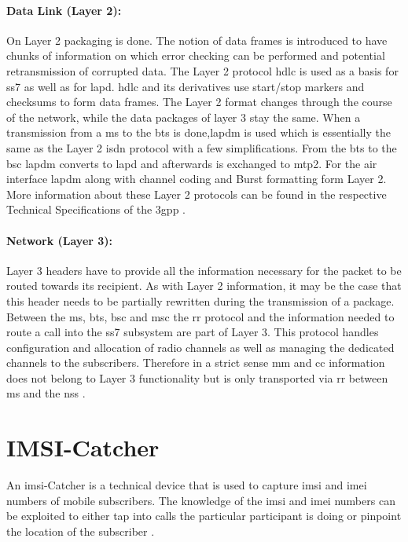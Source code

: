 \paragraph{Data Link (Layer 2):} On Layer 2 packaging is done.
The notion of data frames is introduced to have chunks of information on which error checking can be performed and potential retransmission of corrupted data.
The Layer 2 protocol \gls{hdlc} is used as a basis for \gls{ss7} as well as for \gls{lapd}.
\gls{hdlc} and its derivatives use start/stop markers and checksums to form data frames.
The Layer 2 format changes through the course of the network, while the data packages of layer 3 stay the same.
When a transmission from a \gls{ms} to the \gls{bts} is done,\gls{lapdm} is used which is essentially the same as the Layer 2 \gls{isdn} protocol with a few simplifications.
From the \gls{bts} to the \gls{bsc} \gls{lapdm} converts to \gls{lapd} and afterwards is exchanged to \gls{mtp2}.
For the air interface \gls{lapdm} along with channel coding and Burst formatting form Layer 2.
More information about these Layer 2 protocols can be found in the respective Technical Specifications of the \gls{3gpp} \cite{3gpp_ts_0405,3gpp_ts_0406}.

\paragraph{Network (Layer 3):} Layer 3 headers have to provide all the information necessary for the packet to be routed towards its recipient.
As with Layer 2 information, it may be the case that this header needs to be partially rewritten during the transmission of a package.
Between the \gls{ms}, \gls{bts}, \gls{bsc} and \gls{msc} the \gls{rr} protocol and the information needed to route a call into the \gls{ss7} subsystem are part of Layer 3.
This protocol handles configuration and allocation of radio channels as well as managing the dedicated channels to the subscribers.
Therefore in a strict sense \gls{mm} and \gls{cc} information does not belong to Layer 3 functionality but is only transported via \gls{rr} between \gls{ms} and the \gls{nss} \cite{protocols1999}.

\section{IMSI-Catcher}
\label{sec:catcher}

An \gls{imsi}-Catcher is a technical device that is used to capture \gls{imsi} and \gls{imei} numbers of mobile subscribers.
The knowledge of the \gls{imsi} and \gls{imei} numbers can be exploited to either tap into calls the particular participant is doing or pinpoint the location of the subscriber \cite{fox}.

